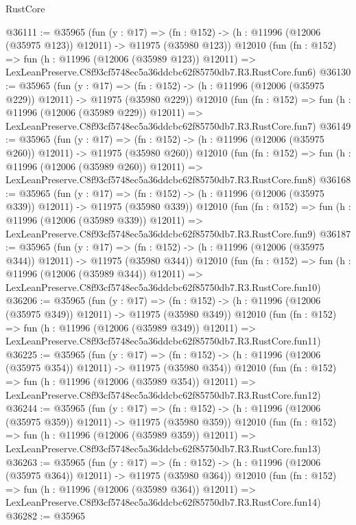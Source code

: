 \begin{lexlean}{RustCore}
\begin{coremodule}
@36111 := @35965
    (fun (y : @17) =>
    (fn : @152) -> (h : @11996 (@12006 (@35975 @123)) @12011) -> @11975 (@35980 @123))
    @12010
    (fun (fn : @152) =>
    fun (h : @11996 (@12006 (@35989 @123)) @12011) =>
    LexLeanPreserve.C8f93cf5748ec5a36ddcbc62f85750db7.R3.RustCore.fun6)
@36130 := @35965
    (fun (y : @17) =>
    (fn : @152) -> (h : @11996 (@12006 (@35975 @229)) @12011) -> @11975 (@35980 @229))
    @12010
    (fun (fn : @152) =>
    fun (h : @11996 (@12006 (@35989 @229)) @12011) =>
    LexLeanPreserve.C8f93cf5748ec5a36ddcbc62f85750db7.R3.RustCore.fun7)
@36149 := @35965
    (fun (y : @17) =>
    (fn : @152) -> (h : @11996 (@12006 (@35975 @260)) @12011) -> @11975 (@35980 @260))
    @12010
    (fun (fn : @152) =>
    fun (h : @11996 (@12006 (@35989 @260)) @12011) =>
    LexLeanPreserve.C8f93cf5748ec5a36ddcbc62f85750db7.R3.RustCore.fun8)
@36168 := @35965
    (fun (y : @17) =>
    (fn : @152) -> (h : @11996 (@12006 (@35975 @339)) @12011) -> @11975 (@35980 @339))
    @12010
    (fun (fn : @152) =>
    fun (h : @11996 (@12006 (@35989 @339)) @12011) =>
    LexLeanPreserve.C8f93cf5748ec5a36ddcbc62f85750db7.R3.RustCore.fun9)
@36187 := @35965
    (fun (y : @17) =>
    (fn : @152) -> (h : @11996 (@12006 (@35975 @344)) @12011) -> @11975 (@35980 @344))
    @12010
    (fun (fn : @152) =>
    fun (h : @11996 (@12006 (@35989 @344)) @12011) =>
    LexLeanPreserve.C8f93cf5748ec5a36ddcbc62f85750db7.R3.RustCore.fun10)
@36206 := @35965
    (fun (y : @17) =>
    (fn : @152) -> (h : @11996 (@12006 (@35975 @349)) @12011) -> @11975 (@35980 @349))
    @12010
    (fun (fn : @152) =>
    fun (h : @11996 (@12006 (@35989 @349)) @12011) =>
    LexLeanPreserve.C8f93cf5748ec5a36ddcbc62f85750db7.R3.RustCore.fun11)
@36225 := @35965
    (fun (y : @17) =>
    (fn : @152) -> (h : @11996 (@12006 (@35975 @354)) @12011) -> @11975 (@35980 @354))
    @12010
    (fun (fn : @152) =>
    fun (h : @11996 (@12006 (@35989 @354)) @12011) =>
    LexLeanPreserve.C8f93cf5748ec5a36ddcbc62f85750db7.R3.RustCore.fun12)
@36244 := @35965
    (fun (y : @17) =>
    (fn : @152) -> (h : @11996 (@12006 (@35975 @359)) @12011) -> @11975 (@35980 @359))
    @12010
    (fun (fn : @152) =>
    fun (h : @11996 (@12006 (@35989 @359)) @12011) =>
    LexLeanPreserve.C8f93cf5748ec5a36ddcbc62f85750db7.R3.RustCore.fun13)
@36263 := @35965
    (fun (y : @17) =>
    (fn : @152) -> (h : @11996 (@12006 (@35975 @364)) @12011) -> @11975 (@35980 @364))
    @12010
    (fun (fn : @152) =>
    fun (h : @11996 (@12006 (@35989 @364)) @12011) =>
    LexLeanPreserve.C8f93cf5748ec5a36ddcbc62f85750db7.R3.RustCore.fun14)
@36282 := @35965

\end{coremodule}
\end{lexlean}
